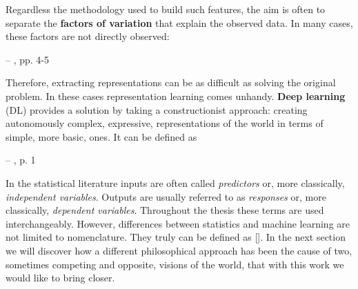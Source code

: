 Regardless the methodology used to build such features, the aim is often to separate the \textbf{factors of variation} that explain the observed data. In many cases, these factors are not directly observed: \begin{displayquote}
     -- \cite{Goodfellow-et-al-2016}, pp. 4-5
\end{displayquote}
Therefore, extracting representations can be as difficult as solving the original problem. In these cases representation learning comes unhandy. \textbf{Deep learning} (DL) provides a solution by taking a constructionist approach: creating autonomously complex, expressive, representations of the world in terms of simple, more basic, ones. It can be defined as 
\begin{displayquote}
     -- \cite{Polson2017}, p. 1
\end{displayquote}

In the statistical literature inputs are often called \textit{predictors} or, more classically, \textit{independent variables}. Outputs are usually referred to as \textit{responses} or, more classically, \textit{dependent variables}. Throughout the thesis these terms are used interchangeably. However, differences between statistics and machine learning are not limited to nomenclature. They truly can be defined as  [\cite{Breiman2001}]. In the next section we will discover how a different philosophical approach has been the cause of two, sometimes competing and opposite, visions of the world, that with this work we would like to bring closer. 





